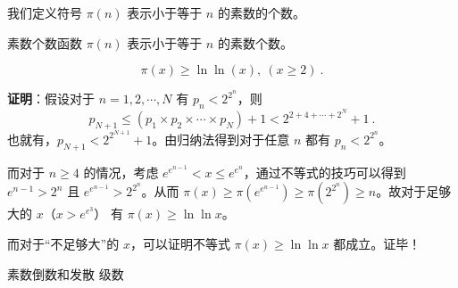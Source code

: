 我们定义符号 $\pi(n)$ 表示小于等于 $n$ 的素数的个数。
\begin{definition}{素数个数函数}
$\pi(n)$ 表示小于等于 $n$ 的素数个数。
\end{definition}

\begin{theorem}{}
\begin{equation}
\pi(x) \ge \ln \ln (x), ~ (x \ge 2) ~.
\end{equation}
\end{theorem}
\textbf{证明}：假设对于 $n = 1, 2, \cdots, N$ 有 $p_n < 2^{2^n}$，则
\begin{equation}
p_{N+1} \leq (p_{1} \times p_2 \times \cdots \times p_N) + 1 < 2^{2+4+\cdots+2^N}+1 ~.
\end{equation}
也就有，$p_{N+1} < 2^{2^{N+1}}+1 $。由归纳法得到对于任意 $n$ 都有 $p_n < 2^{2^n}$。

而对于 $n \ge 4$ 的情况，考虑 $e^{e^{n-1}} <x \le e^{e^n}$，通过不等式的技巧可以得到 $e^{n-1} > 2^n$ 且 $e^{e^{n-1}} > 2^{2^n}$。从而 $\pi(x) \ge \pi(e^{e^{n-1}}) \ge \pi(2^{2^n}) \ge n$。故对于足够大的 $x$（$x > e^{e^3}$） 有 $\pi(x) \ge \ln \ln x$。

而对于“不足够大”的 $x$，可以证明不等式 $\pi(x) \ge \ln \ln x$ 都成立。证毕！

\begin{theorem}{素数倒数和发散}
级数
\end{theorem}